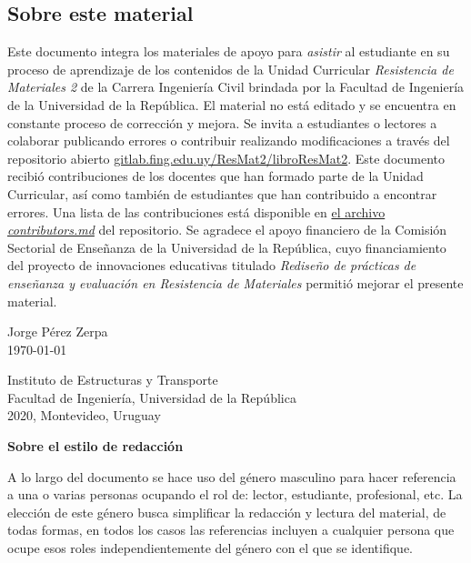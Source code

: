 \subsection*{Sobre este material}

Este documento integra los materiales de apoyo para \textit{asistir} al estudiante en su proceso de aprendizaje de los contenidos de la Unidad Curricular \textit{Resistencia de Materiales 2} de la Carrera Ingeniería Civil brindada por la Facultad de Ingeniería de la Universidad de la República. %
%
El material no está editado y se encuentra en constante proceso de corrección y mejora. Se invita a estudiantes o lectores a colaborar publicando errores o contribuir realizando modificaciones a través del repositorio abierto \href{https://gitlab.fing.edu.uy/ResMat2/libroResMat2}{gitlab.fing.edu.uy/ResMat2/libroResMat2}. %
%
Este documento recibió contribuciones de los docentes que han formado parte de la Unidad Curricular, así como también de estudiantes que han contribuido a encontrar errores. %
Una lista de las contribuciones está disponible en \href{https://gitlab.fing.edu.uy/ResMat2/libroResMat2/-/blob/master/contributors.md}{el archivo \textit{contributors.md}} del repositorio. %
%
Se agradece el apoyo financiero de la Comisión Sectorial de Enseñanza de la Universidad de la República, cuyo financiamiento del proyecto de innovaciones educativas titulado \textit{Rediseño de prácticas de enseñanza y evaluación en Resistencia de Materiales} permitió mejorar el presente material. %
%
\begin{flushright}
Jorge Pérez Zerpa\\
\today
\end{flushright} 

\vspace{4mm}

\begin{flushleft}
Instituto de Estructuras y Transporte\\
Facultad de Ingeniería, Universidad de la República\\
2020, Montevideo, Uruguay
\end{flushleft} 


\vspace{5mm}


\noindent
\textbf{Sobre el estilo de redacción}

A lo largo del documento se hace uso del género masculino para hacer referencia a una o varias personas ocupando el rol de: lector, estudiante, profesional, etc. La elección de este género busca simplificar la redacción y lectura del material, de todas formas, en todos los casos las referencias incluyen a cualquier persona que ocupe esos roles independientemente del género con el que se identifique.

